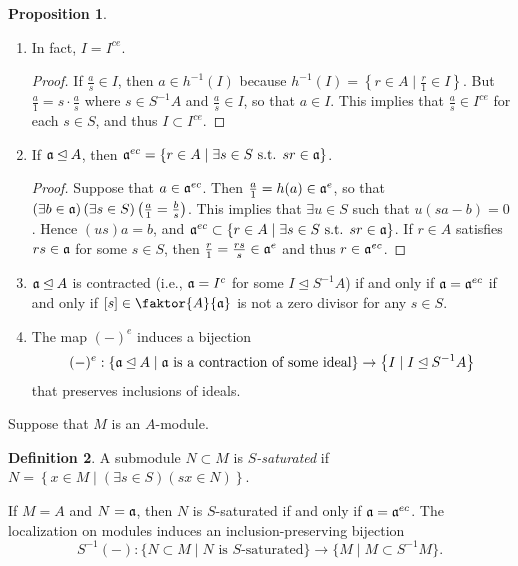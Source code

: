 \documentclass[10pt,letterpaper,cm]{nupset}
\theoremstyle{definition}
\newtheorem{definition}{Definition}[subsection]
\theoremstyle{theorem}
\newtheorem{prop}[definition]{Proposition}
\theoremstyle{remark}
\newcommand{\1}{\mathbf{1}}
\newcommand{\0}{\vec 0}
\begin{document}
\begin{prop} $ $
\begin{enumerate}
\item  In fact, $I = I^{ce}$.  
\begin{proof}
If $\frac{a}{s} \in I$, then $a\in h^{-1}(I)$ because $h^{-1}(I) = \left\{ r\in A \mid \frac{r}{1}\in I\right\}$. But $\frac{a}{1}  = s\cdot \frac{a}{s}$ where $s\in S^{-1}A$ and $\frac{a}{s} \in I$, so that $a\in I$. This implies that $\frac{a}{s} \in I^{ ce}$ for each $s\in S$, and thus $I\subset I^{ce}$. 
\end{proof}
\item If $\frak{a} \unlhd A$, then $\frak{a}^{ec} = \left\{r\in A  \mid \exists s \in S \text{ s.t. } sr \in \frak{a}\right\}$. 
\begin{proof}
Suppose that $a\in \frak{a}^{ec}$. Then $\frac{a}{1} = h(a) \in  \frak{a}^e$, so that $\left(\exists b \in \frak{a}\right)\left(\exists s \in S\right)\left(\frac{a}{1} = \frac{b}{s}\right)$. This implies that $\exists u \in S$ such that $u(sa - b) =0$. Hence $(us)a = b$, and $\frak{a}^{ec} \subset \left\{r\in A  \mid \exists s \in S \text{ s.t. } sr \in \frak{a}\right\}$.  If $r\in A$ satisfies $rs \in \frak{a}$ for some $s\in S$, then $\frac{r}{1} = \frac{rs}{s} \in \frak{a}^e$ and thus $r \in \frak{a}^{ec}$. 
\end{proof}
\item $\frak{a} \unlhd A$ is contracted (i.e., $\frak{a} = I^c$ for some $I \unlhd S^{-1}A$) if and only if $\frak{a} = \frak{a}^{ec}$ if and only if $[s] \in \faktor{A}{\frak{a}}$ is not a zero divisor for any $s\in S$.
\item The map $(-)^e$ induces a bijection $$(-)^e : \left\{\frak{a} \unlhd A \mid \frak{a} \text{ is a contraction of some ideal} \right\} \to \left\{I \mid I \unlhd S^{-1}A\right\}$$ that preserves inclusions of ideals.
\end{enumerate}
\end{prop}

\smallskip

 Suppose that $M$ is an $A$-module. 
\begin{definition}
A submodule $N \subset M$ is \textit{$S$-saturated} if $N=\left \{x \in M \mid \left(\exists s \in S\right)\left(sx\in N\right)\right\}$.
\end{definition} 
If $M=A$ and $N= \frak{a}$, then $N$ is $S$-saturated if and only if $\frak{a} = \frak{a}^{ec}$. The localization on modules induces an inclusion-preserving bijection $$S^{-1}(-) : \{N \subset M \mid N \text{ is } S\text{-saturated}\} \to \{M \mid M \subset S^{-1}M\}.$$
\end{document}
